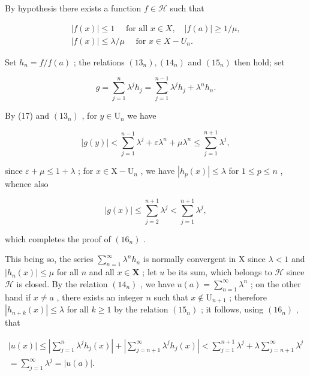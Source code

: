 By hypothesis there exists a function \(f \in \mathcal{H}\) such that

\[
\begin{array}{l} | f (x) | \leqslant 1 \quad \text { for   all } x \in X, \quad | f (a) | \geqslant 1 / \mu , \\ | f (x) | \leqslant \lambda / \mu \quad \text { for } x \in X - U _ {n}. \end{array}
\]

Set \(h_n = f / f(a)\) ; the relations \((13_n), (14_n)\) and \((15_n)\) then hold; set

\[
g = \sum_ {j = 1} ^ {n} \lambda^ {j} h _ {j} = \sum_ {j = 1} ^ {n - 1} \lambda^ {j} h _ {j} + \lambda^ {n} h _ {n}.
\]

By (17) and \((13_{n})\) , for \(y \in \mathrm{U}_n\) we have

\[
| g (y) | <   \sum_ {j = 1} ^ {n - 1} \lambda^ {j} + \varepsilon \lambda^ {n} + \mu \lambda^ {n} \leqslant \sum_ {j = 1} ^ {n + 1} \lambda^ {j},
\]

since \(\varepsilon + \mu \leqslant 1 + \lambda\) ; for \(x \in \mathrm{X} - \mathrm{U}_n\) , we have \(|h_p(x)| \leqslant \lambda\) for \(1 \leqslant p \leqslant n\) , whence also

\[
| g (x) | \leqslant \sum_ {j = 2} ^ {n + 1} \lambda^ {j} <   \sum_ {j = 1} ^ {n + 1} \lambda^ {j},
\]

which completes the proof of \((16_{n})\) .

This being so, the series \(\sum_{n=1}^{\infty} \lambda^n h_n\) is normally convergent in X since \(\lambda < 1\) and \(|h_n(x)| \leqslant \mu\) for all \(n\) and all \(x \in \mathbf{X}\) ; let \(u\) be its sum, which belongs to \(\mathcal{H}\) since \(\mathcal{H}\) is closed. By the relation \((14_n)\) , we have \(u(a) = \sum_{n=1}^{\infty} \lambda^n\) ; on the other hand if \(x \neq a\) , there exists an integer \(n\) such that \(x \notin \mathrm{U}_{n+1}\) ; therefore \(|h_{n+k}(x)| \leqslant \lambda\) for all \(k \geqslant 1\) by the relation \((15_n)\) ; it follows, using \((16_n)\) , that

\[
\begin{array}{l} | u (x) | \leqslant \left| \sum_ {j = 1} ^ {n} \lambda^ {j} h _ {j} (x) \right| + \left| \sum_ {j = n + 1} ^ {\infty} \lambda^ {j} h _ {j} (x) \right| <   \sum_ {j = 1} ^ {n + 1} \lambda^ {j} + \lambda \sum_ {j = n + 1} ^ {\infty} \lambda^ {j} \\ = \sum_ {j = 1} ^ {\infty} \lambda^ {j} = | u (a) |. \end{array}
\]

